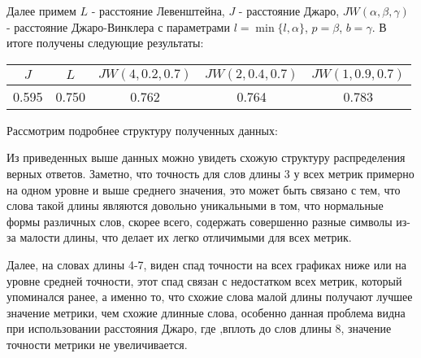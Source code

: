 \documentclass[12pt, a4paper]{article}
\begin{document}
Далее примем $L$ - расстояние Левенштейна, $J$ - расстояние Джаро, $JW(\alpha, \beta, \gamma)$ - расстояние Джаро-Винклера с параметрами $l=\min\{l, \alpha\}$, $p=\beta$, $b=\gamma$. В итоге получены следующие результаты:

\begin{center}
\begin{tabular}{ |c|c|c|c|c| } 
\hline
$J$ & $L$ & $JW(4, 0.2, 0.7)$ & $JW(2, 0.4, 0.7)$ & $JW(1, 0.9, 0.7)$ \\ 
\hline
0.595 & 0.750 & 0.762 & 0.764 & 0.783 \\
\hline
\end{tabular}
\end{center}

Рассмотрим подробнее структуру полученных данных:

\begin{figure}[htbp]
\label{ris:Jaro.png}
\end{figure}

\begin{figure}[htbp]
\label{ris:Jaro-Winkler.png}
\end{figure}

\newpage

\begin{figure}[htp]
\label{ris:Levenshtein.png}
\end{figure}

Из приведенных выше данных можно увидеть схожую структуру распределения верных ответов. Заметно, что точность для слов длины 3 у всех метрик примерно на одном уровне и выше среднего значения, это может быть связано с тем, что слова такой длины являются довольно уникальными в том, что нормальные формы различных слов, скорее всего, содержать совершенно разные символы из-за малости длины, что делает их легко отличимыми для всех метрик. 

Далее, на словах длины 4-7, виден спад точности на всех графиках ниже или на уровне средней точности, этот спад связан с недостатком всех метрик, который упоминался ранее, а именно то, что схожие слова малой длины получают лучшее значение метрики, чем схожие длинные слова, особенно данная проблема видна при использовании расстояния Джаро, где ,вплоть до слов длины 8, значение точности метрики не увеличивается.
\end{document}
